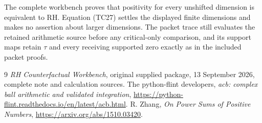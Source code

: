 \documentclass[11pt]{article}
\begin{document}
The complete workbench proves that positivity for every
unshifted dimension is equivalent to RH. Equation (TC27)
settles the displayed finite dimensions and makes no assertion
about larger dimensions. The packet trace still evaluates
the retained arithmetic source before any critical-only
comparison, and its support maps retain $\tau$ and every
receiving supported zero exactly as in the included packet
proofs.

\begin{thebibliography}{9}
\emph{RH Counterfactual Workbench}, original supplied package,
13 September 2026, complete note and calculation sources.
The python-flint developers,
\emph{acb: complex ball arithmetic and validated integration},
\url{https://python-flint.readthedocs.io/en/latest/acb.html}.
R. Zhang, \emph{On Power Sums of Positive Numbers},
\url{https://arxiv.org/abs/1510.03420}.
\end{thebibliography}
\end{document}
